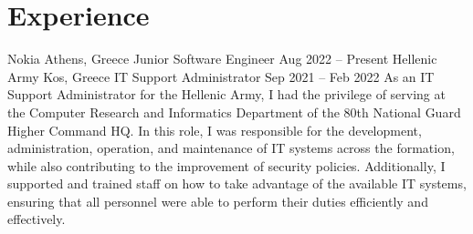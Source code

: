 \section{Experience}

\begin{itemize}
    \cventryiv
        {Nokia}
        {Athens, Greece}
        {Junior Software Engineer}
        {Aug 2022 -- Present}
    \cventryiv
        {Hellenic Army}
        {Kos, Greece}
        {IT Support Administrator}
        {Sep 2021 -- Feb 2022}
    \cventryi
        {As an IT Support Administrator for the Hellenic Army, I had the privilege of serving at the Computer Research and Informatics Department of the 80th National Guard Higher Command HQ. In this role, I was responsible for the development, administration, operation, and maintenance of IT systems across the formation, while also contributing to the improvement of security policies. Additionally, I supported and trained staff on how to take advantage of the available IT systems, ensuring that all personnel were able to perform their duties efficiently and effectively.}
\end{itemize}
